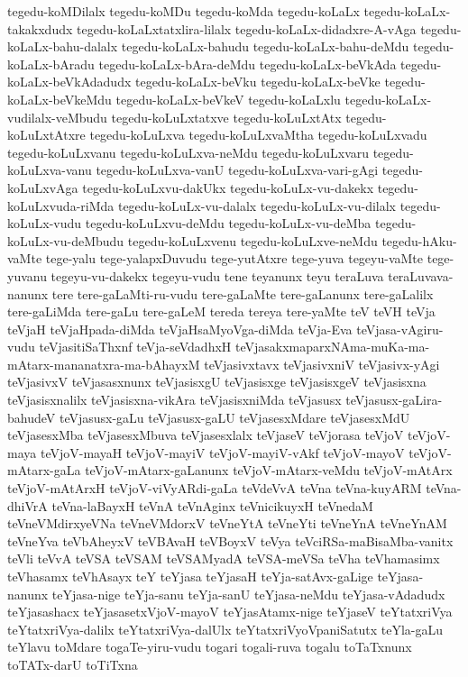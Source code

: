 {tegedu-koMDilalx
tegedu-koMDu
tegedu-koMda
tegedu-koLaLx
tegedu-koLaLx-takakxdudx
tegedu-koLaLxtatxlira-lilalx
tegedu-koLaLx-didadxre-A-vAga
tegedu-koLaLx-bahu-dalalx
tegedu-koLaLx-bahudu
tegedu-koLaLx-bahu-deMdu
tegedu-koLaLx-bAradu
tegedu-koLaLx-bAra-deMdu
tegedu-koLaLx-beVkAda
tegedu-koLaLx-beVkAdadudx
tegedu-koLaLx-beVku
tegedu-koLaLx-beVke
tegedu-koLaLx-beVkeMdu
tegedu-koLaLx-beVkeV
tegedu-koLaLxlu
tegedu-koLaLx-vudilalx-veMbudu
tegedu-koLuLxtatxve
tegedu-koLuLxtAtx
tegedu-koLuLxtAtxre
tegedu-koLuLxva
tegedu-koLuLxvaMtha
tegedu-koLuLxvadu
tegedu-koLuLxvanu
tegedu-koLuLxva-neMdu
tegedu-koLuLxvaru
tegedu-koLuLxva-vanu
tegedu-koLuLxva-vanU
tegedu-koLuLxva-vari-gAgi
tegedu-koLuLxvAga
tegedu-koLuLxvu-dakUkx
tegedu-koLuLx-vu-dakekx
tegedu-koLuLxvuda-riMda
tegedu-koLuLx-vu-dalalx
tegedu-koLuLx-vu-dilalx
tegedu-koLuLx-vudu
tegedu-koLuLxvu-deMdu
tegedu-koLuLx-vu-deMba
tegedu-koLuLx-vu-deMbudu
tegedu-koLuLxvenu
tegedu-koLuLxve-neMdu
tegedu-hAku-vaMte
tege-yalu
tege-yalapxDuvudu
tege-yutAtxre
tege-yuva
tegeyu-vaMte
tege-yuvanu
tegeyu-vu-dakekx
tegeyu-vudu
tene
teyanunx
teyu
teraLuva
teraLuvava-nanunx
tere
tere-gaLaMti-ru-vudu
tere-gaLaMte
tere-gaLanunx
tere-gaLalilx
tere-gaLiMda
tere-gaLu
tere-gaLeM
tereda
tereya
tere-yaMte
teV
teVH
teVja
teVjaH
teVjaHpada-diMda
teVjaHsaMyoVga-diMda
teVja-Eva
teVjasa-vAgiru-vudu
teVjasitiSaThxnf
teVja-seVdadhxH
teVjasakxmaparxNAma-muKa-ma-mAtarx-mananatxra-ma-bAhayxM
teVjasivxtavx
teVjasivxniV
teVjasivx-yAgi
teVjasivxV
teVjasasxnunx
teVjasisxgU
teVjasisxge
teVjasisxgeV
teVjasisxna
teVjasisxnalilx
teVjasisxna-vikAra
teVjasisxniMda
teVjasusx
teVjasusx-gaLira-bahudeV
teVjasusx-gaLu
teVjasusx-gaLU
teVjasesxMdare
teVjasesxMdU
teVjasesxMba
teVjasesxMbuva
teVjasesxlalx
teVjaseV
teVjorasa
teVjoV
teVjoV-maya
teVjoV-mayaH
teVjoV-mayiV
teVjoV-mayiV-vAkf
teVjoV-mayoV
teVjoV-mAtarx-gaLa
teVjoV-mAtarx-gaLanunx
teVjoV-mAtarx-veMdu
teVjoV-mAtArx
teVjoV-mAtArxH
teVjoV-viVyARdi-gaLa
teVdeVvA
teVna
teVna-kuyARM
teVna-dhiVrA
teVna-laBayxH
teVnA
teVnAginx
teVnicikuyxH
teVnedaM
teVneVMdirxyeVNa
teVneVMdorxV
teVneYtA
teVneYti
teVneYnA
teVneYnAM
teVneYva
teVbAheyxV
teVBAvaH
teVBoyxV
teVya
teVciRSa-maBisaMba-vanitx
teVli
teVvA
teVSA
teVSAM
teVSAMyadA
teVSA-meVSa
teVha
teVhamasimx
teVhasamx
teVhAsayx
teY
teYjasa
teYjasaH
teYja-satAvx-gaLige
teYjasa-nanunx
teYjasa-nige
teYja-sanu
teYja-sanU
teYjasa-neMdu
teYjasa-vAdadudx
teYjasashacx
teYjasasetxVjoV-mayoV
teYjasAtamx-nige
teYjaseV
teYtatxriVya
teYtatxriVya-dalilx
teYtatxriVya-dalUlx
teYtatxriVyoVpaniSatutx
teYla-gaLu
teYlavu
toMdare
togaTe-yiru-vudu
togari
togali-ruva
togalu
toTaTxnunx
toTATx-darU
toTiTxna
}
